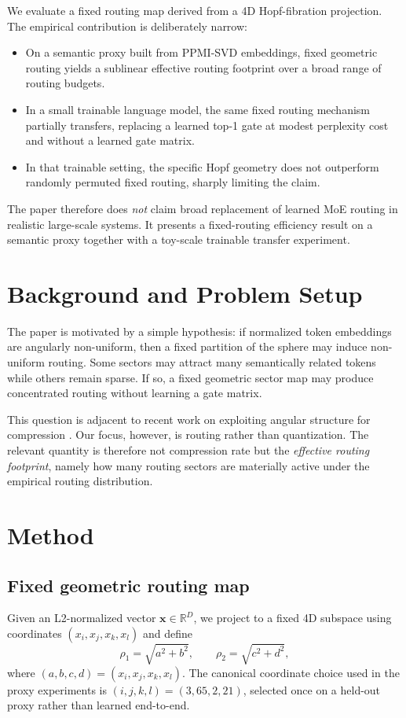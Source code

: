 \documentclass[10pt,conference]{IEEEtran}
\begin{document}
We evaluate a fixed routing map derived from a 4D Hopf-fibration projection. The empirical contribution is deliberately narrow:
\begin{itemize}
    \item On a semantic proxy built from PPMI-SVD embeddings, fixed geometric routing yields a sublinear effective routing footprint over a broad range of routing budgets.
    \item In a small trainable language model, the same fixed routing mechanism partially transfers, replacing a learned top-1 gate at modest perplexity cost and without a learned gate matrix.
    \item In that trainable setting, the specific Hopf geometry does not outperform randomly permuted fixed routing, sharply limiting the claim.
\end{itemize}

The paper therefore does \emph{not} claim broad replacement of learned MoE routing in realistic large-scale systems. It presents a fixed-routing efficiency result on a semantic proxy together with a toy-scale trainable transfer experiment.

\section{Background and Problem Setup}
The paper is motivated by a simple hypothesis: if normalized token embeddings are angularly non-uniform, then a fixed partition of the sphere may induce non-uniform routing. Some sectors may attract many semantically related tokens while others remain sparse. If so, a fixed geometric sector map may produce concentrated routing without learning a gate matrix.

This question is adjacent to recent work on exploiting angular structure for compression \citep{turboquant2026}. Our focus, however, is routing rather than quantization. The relevant quantity is therefore not compression rate but the \emph{effective routing footprint}, namely how many routing sectors are materially active under the empirical routing distribution.

\section{Method}
\subsection{Fixed geometric routing map}
Given an L2-normalized vector $\mathbf{x} \in \mathbb{R}^D$, we project to a fixed 4D subspace using coordinates $(x_i,x_j,x_k,x_l)$ and define
\begin{equation}
\rho_1 = \sqrt{a^2+b^2}, \qquad \rho_2 = \sqrt{c^2+d^2},
\end{equation}
where $(a,b,c,d)=(x_i,x_j,x_k,x_l)$. The canonical coordinate choice used in the proxy experiments is $(i,j,k,l)=(3,65,2,21)$, selected once on a held-out proxy rather than learned end-to-end.
\end{document}
